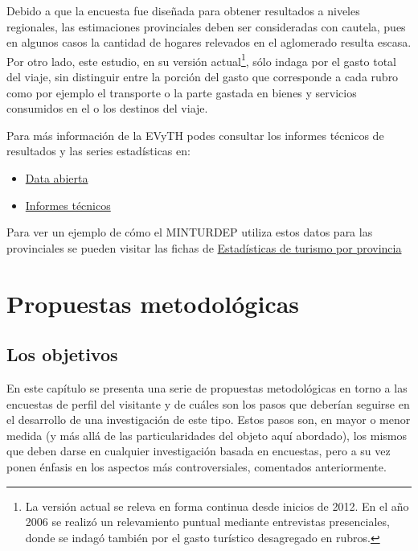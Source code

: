 \documentclass[
]{book}
\providecommand{\tightlist}{%
  \setlength{\itemsep}{0pt}\setlength{\parskip}{0pt}}
\begin{document}
Debido a que la encuesta fue diseñada para obtener resultados a niveles regionales, las estimaciones provinciales deben ser consideradas con cautela, pues en algunos casos la cantidad de hogares relevados en el aglomerado resulta escasa. Por otro lado, este estudio, en su versión actual\footnote{La versión actual se releva en forma continua desde inicios de 2012. En el año 2006 se realizó un relevamiento puntual mediante entrevistas presenciales, donde se indagó también por el gasto turístico desagregado en rubros.}, sólo indaga por el gasto total del viaje, sin distinguir entre la porción del gasto que corresponde a cada rubro como por ejemplo el transporte o la parte gastada en bienes y servicios consumidos en el o los destinos del viaje.

Para más información de la EVyTH podes consultar los informes técnicos de resultados y las series estadísticas en:

\begin{itemize}
\tightlist
\item
  \href{http://datos.yvera.gob.ar/dataset/encuesta-viajes-turismo-hogares-evyth}{Data abierta}\\
\item
  \href{https://www.yvera.tur.ar/estadistica/info/encuesta-de-viajes-y-turismo-de-los-hogares-evyth}{Informes técnicos}
\end{itemize}

Para ver un ejemplo de cómo el MINTURDEP utiliza estos datos para las provinciales se pueden visitar las fichas de \href{https://www.yvera.tur.ar/estadistica/info/estadisticas-de-turismo-por-provincias}{Estadísticas de turismo por provincia}

\hypertarget{propuestas-metodologicas}{%
\chapter{\texorpdfstring{\textbf{Propuestas metodológicas}}{Propuestas metodológicas}}\label{propuestas-metodologicas}}

\hypertarget{los-objetivos}{%
\section{Los objetivos}\label{los-objetivos}}

En este capítulo se presenta una serie de propuestas metodológicas en torno a las encuestas de perfil del visitante y de cuáles son los pasos que deberían seguirse en el desarrollo de una investigación de este tipo. Estos pasos son, en mayor o menor medida (y más allá de las particularidades del objeto aquí abordado), los mismos que deben darse en cualquier investigación basada en encuestas, pero a su vez ponen énfasis en los aspectos más controversiales, comentados anteriormente.
\end{document}
